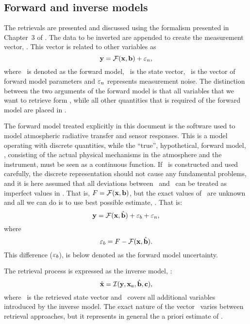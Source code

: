 \subsection{Forward and inverse models}
%
The retrievals are presented and discussed using the formalism presented in
Chapter~3 of \citet{rodgers:00}. The data to be inverted are appended to create
the measurement vector, \MsrVct. This vector is related to other variables as
\begin{equation}
  \label{eq:fmodel1}
  \mathbf{y} = \mathcal{F}(\mathbf{x},\mathbf{b}) + \varepsilon_n,
\end{equation}
where \FrwMdl\ is denoted as the forward model, \SttVct\ is the state vector,
\FrwMdlVct\ is the vector of forward model parameters and $\varepsilon_n$
represents measurement noise. The distinction between the two arguments of the
forward model is that all variables that we want to retrieve form \SttVct,
while all other quantities that is required of the forward model are placed in
\FrwMdlVct. 

The forward model treated explicitly in this document is the software used to
model atmospheric radiative transfer and sensor responses. This is a model
operating with discrete quantities, while the ``true'', hypothetical, forward
model, \trueFrwMdl, consisting of the actual physical mechanisms in the
atmosphere and the instrument, must be seen as a continuous function. If
\FrwMdl\ is constructed and used carefully, the discrete representation should
not cause any fundamental problems, and it is here assumed that all deviations
between \trueFrwMdl\ and \FrwMdl\ can be treated as imperfect values in
\FrwMdlVct. That is, $F=\mathcal{F}(\mathbf{x},\mathbf{b})$, but the exact
values of \FrwMdlVct\ are unknown and all we can do is to use best possible
estimate, \FrwMdlVctHat. That is:
\begin{equation}
  \label{eq:fmodel2}
  \mathbf{y} = \mathcal{F}(\mathbf{x},\hat{\mathbf{b}}) + \varepsilon_b + \varepsilon_n,
\end{equation}
where 
\begin{equation}
  \label{eq:eps_b}
  \varepsilon_b = F - \mathcal{F}(\mathbf{x},\hat{\mathbf{b}}).
\end{equation}
This difference ($\varepsilon_b$), is below denoted as the forward model
uncertainty. 

The retrieval process is expressed as the inverse model, \InvMdl:
\begin{equation}
  \label{eq:imodel}
   \hat{\mathbf{x}} = \mathcal{I}(\mathbf{y},\mathbf{x}_{a},\hat{\mathbf{b}},\mathbf{c}),
\end{equation}
where \RtrVct\ is the retrieved state vector and \InvMdlVct\ covers all
additional variables introduced by the inverse model. The exact nature
of the vector \ varies between retrieval approaches, but it 
represents in general the a priori estimate of \SttVct.


